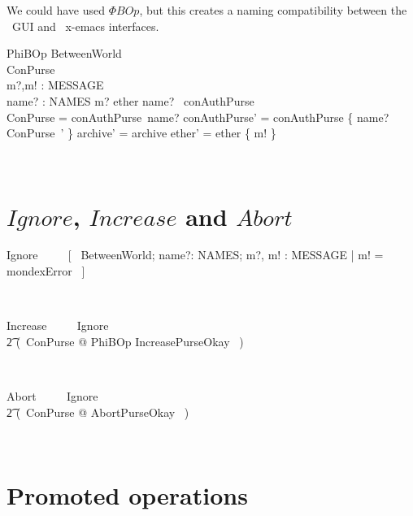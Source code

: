 We could have used $\Phi BOp$, but this creates a naming compatibility
between the \zeves\ GUI and \zeves\ x-emacs interfaces.
%
\begin{LSDef}
\begin{schema}{PhiBOp}
  \Delta BetweenWorld
  \\    \Delta ConPurse
  \\    m?,m! : MESSAGE
  \\    name? : NAMES
  \where
  m? \in ether
  \also
  name? \in \dom~conAuthPurse
  \\    \theta ConPurse = conAuthPurse~name?
  \also
  conAuthPurse' = conAuthPurse \oplus \{ name? \mapsto \theta ConPurse~' \}
  \also
  archive' = archive
  \also
  ether' = ether \cup \{ m! \}
\end{schema}~\end{LSDef}

\section{$Ignore$, $Increase$ and $Abort$}\label{ch5.ignore.increase.abort}

\begin{LSDef}
\begin{zed}
  Ignore ~~~~ [~ \Xi BetweenWorld; name?: NAMES; m?, m! : MESSAGE | m! = mondexError ~]
\end{zed}~\end{LSDef}

\begin{LSDef}
\begin{zed}
  Increase ~~~~ Ignore
  \\ \t2                \lor (~\exists \Delta ConPurse @
  PhiBOp \land IncreasePurseOkay ~)
\end{zed}~\end{LSDef}

\begin{LSDef}
\begin{zed}
  Abort ~~~~ Ignore
  \\ \t2                \lor (~\exists \Delta ConPurse @
  AbortPurseOkay \land [~ PhiBOp | m! = mondexError ~]~)
\end{zed}~\end{LSDef}

\section{Promoted operations}\label{ch5.promoted}


